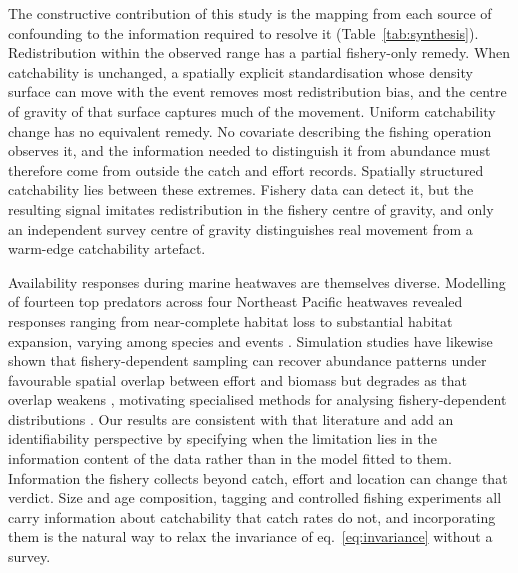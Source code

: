 \documentclass[11pt,a4paper]{article}
\begin{document}
The constructive contribution of this study is the mapping from each source of confounding to the information required to resolve it (Table~\ref{tab:synthesis}). Redistribution within the observed range has a partial fishery-only remedy. When catchability is unchanged, a spatially explicit standardisation whose density surface can move with the event removes most redistribution bias, and the centre of gravity of that surface captures much of the movement. Uniform catchability change has no equivalent remedy. No covariate describing the fishing operation observes it, and the information needed to distinguish it from abundance must therefore come from outside the catch and effort records. Spatially structured catchability lies between these extremes. Fishery data can detect it, but the resulting signal imitates redistribution in the fishery centre of gravity, and only an independent survey centre of gravity distinguishes real movement from a warm-edge catchability artefact.

Availability responses during marine heatwaves are themselves diverse. Modelling of fourteen top predators across four Northeast Pacific heatwaves revealed responses ranging from near-complete habitat loss to substantial habitat expansion, varying among species and events \citep{welch2023}. Simulation studies have likewise shown that fishery-dependent sampling can recover abundance patterns under favourable spatial overlap between effort and biomass but degrades as that overlap weakens \citep{ducharme2022}, motivating specialised methods for analysing fishery-dependent distributions \citep{karp2023}. Our results are consistent with that literature and add an identifiability perspective by specifying when the limitation lies in the information content of the data rather than in the model fitted to them. Information the fishery collects beyond catch, effort and location can change that verdict. Size and age composition, tagging and controlled fishing experiments all carry information about catchability that catch rates do not, and incorporating them is the natural way to relax the invariance of eq.~\eqref{eq:invariance} without a survey.
\end{document}
